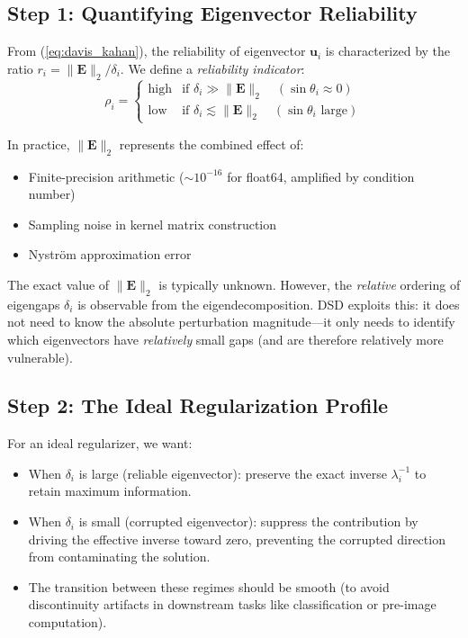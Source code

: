 \documentclass[preprint,review,12pt]{elsarticle}
\begin{document}
\subsection{Step 1: Quantifying Eigenvector Reliability}

From (\ref{eq:davis_kahan}), the reliability of eigenvector $\bm{u}_i$ is characterized by the ratio $r_i = \|\bm{E}\|_2 / \delta_i$. We define a \emph{reliability indicator}:
\begin{equation}
\rho_i = \begin{cases}
\text{high} & \text{if } \delta_i \gg \|\bm{E}\|_2 \quad (\sin\theta_i \approx 0) \\
\text{low} & \text{if } \delta_i \lesssim \|\bm{E}\|_2 \quad (\sin\theta_i \text{ large})
\end{cases}
\end{equation}

In practice, $\|\bm{E}\|_2$ represents the combined effect of:
\begin{itemize}
\item Finite-precision arithmetic ($\sim 10^{-16}$ for float64, amplified by condition number)
\item Sampling noise in kernel matrix construction
\item Nystr\"{o}m approximation error
\end{itemize}
The exact value of $\|\bm{E}\|_2$ is typically unknown. However, the \emph{relative} ordering of eigengaps $\delta_i$ is observable from the eigendecomposition. DSD exploits this: it does not need to know the absolute perturbation magnitude---it only needs to identify which eigenvectors have \emph{relatively} small gaps (and are therefore relatively more vulnerable).

\subsection{Step 2: The Ideal Regularization Profile}

For an ideal regularizer, we want:
\begin{itemize}
\item When $\delta_i$ is large (reliable eigenvector): preserve the exact inverse $\lambda_i^{-1}$ to retain maximum information.
\item When $\delta_i$ is small (corrupted eigenvector): suppress the contribution by driving the effective inverse toward zero, preventing the corrupted direction from contaminating the solution.
\item The transition between these regimes should be smooth (to avoid discontinuity artifacts in downstream tasks like classification or pre-image computation).
\end{itemize}
\end{document}
